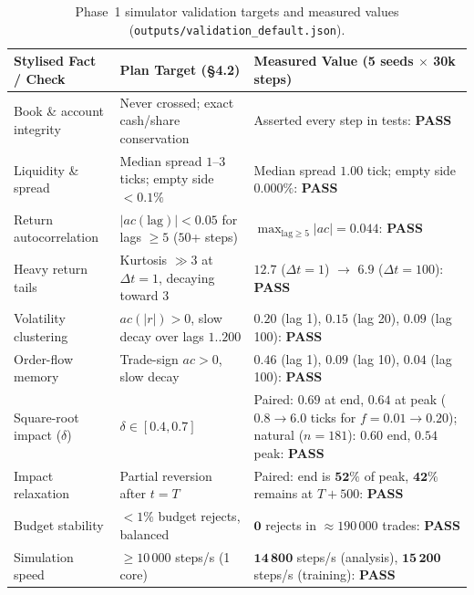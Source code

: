 \documentclass[11pt,a4paper]{article}
\newcommand{\code}[1]{\texttt{#1}}
\begin{document}
\begin{table}[h!]
\centering\small
\begin{tabular}{L{3.5cm} L{3.8cm} L{6.8cm}}
\toprule
Stylised Fact / Check & Plan Target (\S4.2) & Measured Value (5 seeds $\times$ 30k steps) \\
\midrule
Book \& account integrity & Never crossed; exact cash/share conservation & Asserted every step in tests: \textbf{PASS} \\
Liquidity \& spread & Median spread $1$--$3$ ticks; empty side $<0.1\%$ & Median spread $\mathbf{1.00}$ tick; empty side $\mathbf{0.000\%}$: \textbf{PASS} \\
Return autocorrelation & $|ac(\text{lag})| < 0.05$ for lags $\ge 5$ ($50$+ steps) & $\max_{\text{lag}\ge 5} |ac| = \mathbf{0.044}$: \textbf{PASS} \\
Heavy return tails & Kurtosis $\gg 3$ at $\Delta t=1$, decaying toward $3$ & $\mathbf{12.7}$ ($\Delta t=1$) $\to$ $\mathbf{6.9}$ ($\Delta t=100$): \textbf{PASS} \\
Volatility clustering & $ac(|r|) > 0$, slow decay over lags $1..200$ & $\mathbf{0.20}$ (lag 1), $\mathbf{0.15}$ (lag 20), $\mathbf{0.09}$ (lag 100): \textbf{PASS} \\
Order-flow memory & Trade-sign $ac > 0$, slow decay & $\mathbf{0.46}$ (lag 1), $\mathbf{0.09}$ (lag 10), $\mathbf{0.04}$ (lag 100): \textbf{PASS} \\
Square-root impact ($\delta$) & $\delta \in [0.4, 0.7]$ & Paired: $\mathbf{0.69}$ at end, $\mathbf{0.64}$ at peak ($0.8 \to 6.0$ ticks for $f=0.01\to 0.20$); natural ($n=181$): $\mathbf{0.60}$ end, $\mathbf{0.54}$ peak: \textbf{PASS} \\
Impact relaxation & Partial reversion after $t=T$ & Paired: end is $\mathbf{52\%}$ of peak, $\mathbf{42\%}$ remains at $T+500$: \textbf{PASS} \\
Budget stability & $<1\%$ budget rejects, balanced & $\mathbf{0}$ rejects in $\approx 190\,000$ trades: \textbf{PASS} \\
Simulation speed & $\ge 10\,000$ steps/s (1 core) & $\mathbf{14\,800}$ steps/s (analysis), $\mathbf{15\,200}$ steps/s (training): \textbf{PASS} \\
\bottomrule
\end{tabular}
\caption{Phase~1 simulator validation targets and measured values (\code{outputs/validation\_default.json}).}
\label{tab:targets}
\end{table}

\end{document}
